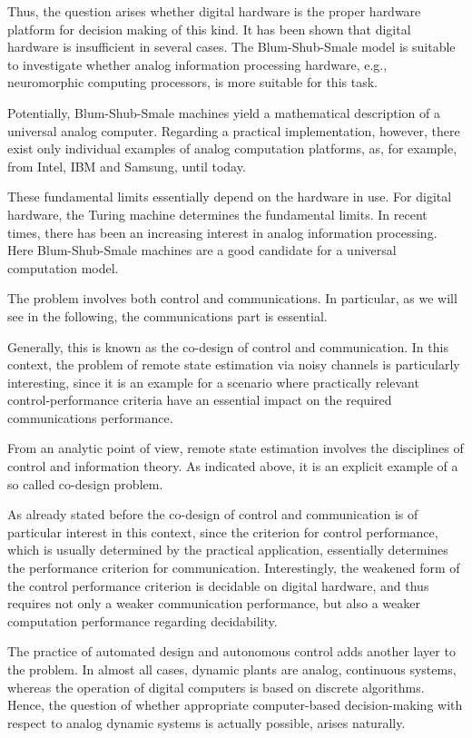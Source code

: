 \documentclass[conference]{IEEEtran}
\begin{document}
	{\color{red} Thus, the question arises whether digital hardware is the proper hardware platform for decision making of this kind. It has been shown
	that digital hardware is insufficient in several cases. The Blum-Shub-Smale model is suitable to investigate whether analog information processing hardware, e.g., neuromorphic computing
	processors, is more suitable for this task.}

	{\color{red} Potentially, Blum-Shub-Smale machines yield a mathematical description of a universal analog computer.
	Regarding a practical implementation, however, there exist only individual examples of analog computation platforms, as, for example, from Intel, IBM and Samsung, until today.}
	
	{\color{red} These fundamental limits essentially depend on the hardware in use. For digital hardware, the Turing machine determines the fundamental limits. 
	In recent times, there has been an increasing interest in analog information processing. Here Blum-Shub-Smale machines are a good candidate for a universal computation model.}
	
	{\color{violet} The problem involves both control and communications. In particular, as we will see in the following, the communications part is essential.}  
	
	{\color{violet} Generally, this is known as the co-design of control and communication. In this context, the problem of remote state estimation via noisy channels is particularly interesting,
	since it is an example for a scenario where practically relevant control-performance criteria have an essential impact on the required communications performance.}
	
	{\color{violet} From an analytic point of view, remote state estimation involves the disciplines of control and information theory. As indicated above, it is an explicit example of a so 
	called co-design problem.} 
	
	{\color{violet} As already stated before the co-design of control and communication is of particular interest in this context, since the criterion for control performance, which is
	usually determined by the practical application, essentially determines the performance criterion for communication. Interestingly, the weakened form of the control performance criterion 
	is decidable on digital hardware, and thus requires not only a weaker communication performance, but also a weaker computation performance regarding decidability.} 
	
	{\color{green} The practice of automated design and autonomous control adds another layer to the problem. In almost all cases, dynamic plants are analog, continuous  systems, 
	whereas the operation of digital computers is based on discrete algorithms. Hence, the question of whether appropriate computer-based decision-making with respect to analog 
	dynamic systems is actually possible, arises naturally.}
		



\end{document}
